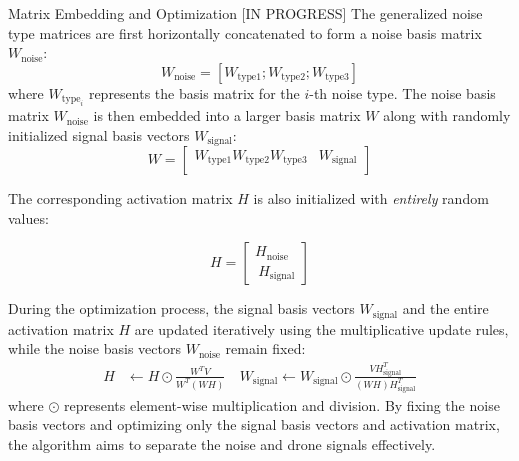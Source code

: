 \documentclass{if-beamer}
\begin{document}
\begin{frame}{Matrix Embedding and Optimization [IN PROGRESS]}
The generalized noise type matrices are first horizontally concatenated to form a noise basis matrix $W_\text{noise}$:
\begin{equation*}
W_\text{noise} = [W_{\text{type}1} ; W_{\text{type}2} ; W_{\text{type}3}]
\end{equation*}
where $W_{\text{type}_i}$ represents the basis matrix for the $i$-th noise type.
The noise basis matrix $W_\text{noise}$ is then embedded into a larger basis matrix $W$ along with randomly initialized signal basis vectors $W_\text{signal}$:
\begin{equation*}
W = \left[\begin{array}{c|c}
\boxed{W_{\text{type}1}} \boxed{W_{\text{type}2}} \boxed{W_{\text{type}3}} & \boxed{W_\text{signal}} \\
\end{array}\right]
\end{equation*}
\begin{minipage}{0.6\textwidth}
The corresponding activation matrix $H$ is also initialized with \textit{entirely} random values:
\end{minipage}
\hfill
\begin{minipage}{0.3\textwidth}
\begin{equation*}
H = \left[\begin{array}{c}
\boxed{H_\text{noise}} \\
\
\boxed{H_\text{signal}}
\end{array}\right]
\end{equation*}
\end{minipage}
During the optimization process, the signal basis vectors $W_\text{signal}$ and the entire activation matrix $H$ are updated iteratively using the multiplicative update rules, while the noise basis vectors $W_\text{noise}$ remain fixed:
\begin{align*}
H &\leftarrow H \odot \frac{W^T V}{W^T (W H)} \ & W_\text{signal}\leftarrow W_\text{signal} \odot \frac{V H_\text{signal}^T}{(W H) H_\text{signal}^T}
\end{align*}
where $\odot$ represents element-wise multiplication and division.
By fixing the noise basis vectors and optimizing only the signal basis vectors and activation matrix, the algorithm aims to separate the noise and drone signals effectively.
\end{frame}

\end{document}
